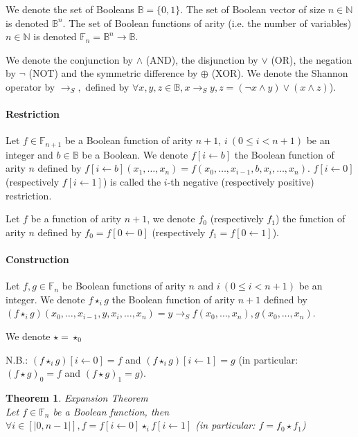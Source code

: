 \documentclass[a4paper,10pt]{article}
\newcommand{\shannon}[3]{#1 \longrightarrow_S #2, #3}
\newcommand{\N}{\mathbb{N}}%
\newcommand{\B}{\mathbb{B}}
\newcommand{\F}{\mathbb{F}}
\newtheorem{newtheo}{Theorem}
\newcommand{\theorem}[2]{\begin{newtheo}{\textsf{#1}\\} #2 \end{newtheo}}
\begin{document}
We denote the set of Booleans $\B = \{0, 1\}$.
The set of Boolean vector of size $n\in\N$ is denoted $\B^n$.
The set of Boolean functions of arity (i.e. the number of variables) $n\in\N$ is denoted $\F_n = \B^n \longrightarrow \B$.


We denote the conjunction by $\land$ (AND), the disjunction by $\lor$ (OR), the negation by $\lnot$ (NOT) and the symmetric difference by $\oplus$ (XOR).
We denote the Shannon operator by $\shannon{}{}{}$ defined by $\forall x, y, z\in\B, \shannon{x}{y}{z} = (\lnot x \land y) \lor (x \land z)$).

\paragraph{Restriction\\}

Let $f\in\F_{n+1}$ be a Boolean function of arity $n+1$, $i~(0\leq i < n+1)$ be an integer and $b\in\B$ be a Boolean.
We denote $f[i\leftarrow b]$ the Boolean function of arity $n$ defined by $f[i\leftarrow b](x_1, \dots, x_n) = f(x_0, \dots, x_{i-1}, b, x_i, \dots, x_n)$.
$f[i\leftarrow 0]$ (respectively $f[i\leftarrow 1]$) is called the $i$-th negative (respectively positive) restriction.

Let $f$ be a function of arity $n+1$, we denote $f_0$ (respectively $f_1$) the function of arity $n$ defined by $f_0 = f[0\leftarrow 0]$ (respectively $f_1 = f[0\leftarrow 1]$).

\paragraph{Construction\\}

Let $f, g \in \F_n$ be Boolean functions of arity $n$ and $i~(0\leq i < n+1)$ be an integer.
We denote $f\star_ig$ the Boolean function of arity $n+1$ defined by $(f\star_ig)(x_0, \dots, x_{i-1}, y, x_i, \dots, x_n) = \shannon{y}{f(x_0, \dots, x_n)}{g(x_0, \dots, x_n)}$.

We denote $\star = \star_0$

N.B.: $(f\star_i g)[i\leftarrow 0] = f$ and $ (f\star_i g)[i\leftarrow 1] = g$ (in particular: $(f\star g)_0 = f$ and $ (f\star g)_1 = g)$.




\theorem{Expansion Theorem}{
Let $f\in\F_n$ be a Boolean function, then $\forall i\in[|0, n-1|], f = f[i\leftarrow 0]\star_i f[i\leftarrow 1]$ (in particular: $f = f_0 \star f_1$)
}
\end{document}
